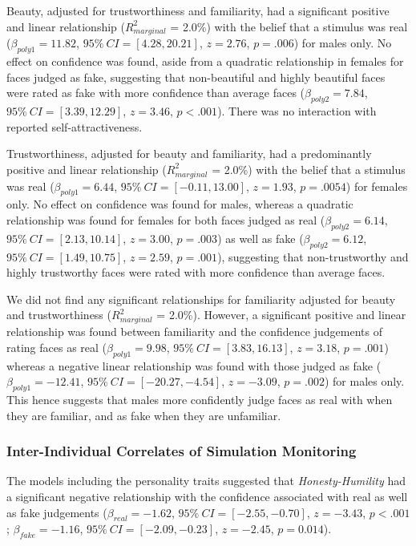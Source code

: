 \documentclass[
  man,floatsintext]{apa6}
\begin{document}
Beauty, adjusted for trustworthiness and familiarity, had a significant positive and linear relationship (\(R^2_{marginal}\) = 2.0\%) with the belief that a stimulus was real (\(\beta_{poly1} = 11.82\), \(95\%~CI = [4.28, 20.21]\), \(z = 2.76\), \(p = .006\)) for males only. No effect on confidence was found, aside from a quadratic relationship in females for faces judged as fake, suggesting that non-beautiful and highly beautiful faces were rated as fake with more confidence than average faces (\(\beta_{poly2} = 7.84\), \(95\%~CI = [3.39, 12.29]\), \(z = 3.46\), \(p < .001\)). There was no interaction with reported self-attractiveness.

Trustworthiness, adjusted for beauty and familiarity, had a predominantly positive and linear relationship (\(R^2_{marginal}\) = 2.0\%) with the belief that a stimulus was real (\(\beta_{poly1} = 6.44\), \(95\%~CI = [-0.11, 13.00]\), \(z = 1.93\), \(p = .0054\)) for females only. No effect on confidence was found for males, whereas a quadratic relationship was found for females for both faces judged as real (\(\beta_{poly2} = 6.14\), \(95\%~CI = [2.13, 10.14]\), \(z = 3.00\), \(p = .003\)) as well as fake (\(\beta_{poly2} =6.12\), \(95\%~CI = [1.49, 10.75]\), \(z = 2.59\), \(p = .001\)), suggesting that non-trustworthy and highly trustworthy faces were rated with more confidence than average faces.

We did not find any significant relationships for familiarity adjusted for beauty and trustworthiness (\(R^2_{marginal}\) = 2.0\%). However, a significant positive and linear relationship was found between familiarity and the confidence judgements of rating faces as real (\(\beta_{poly1} = 9.98\), \(95\%~CI = [3.83, 16.13]\), \(z = 3.18\), \(p = .001\)) whereas a negative linear relationship was found with those judged as fake (\(\beta_{poly1} = -12.41\), \(95\%~CI = [-20.27, -4.54]\), \(z = -3.09\), \(p = .002\)) for males only. This hence suggests that males more confidently judge faces as real with when they are familiar, and as fake when they are unfamiliar.

\hypertarget{inter-individual-correlates-of-simulation-monitoring}{%
\subsubsection{Inter-Individual Correlates of Simulation Monitoring}\label{inter-individual-correlates-of-simulation-monitoring}}

The models including the personality traits suggested that \emph{Honesty-Humility} had a significant negative relationship with the confidence associated with real as well as fake judgements (\(\beta_{real} = -1.62\), \(95\%~CI = [-2.55, -0.70]\), \(z = -3.43\), \(p < .001\); \(\beta_{fake} = -1.16\), \(95\%~CI = [-2.09, -0.23]\), \(z = -2.45\), \(p = 0.014\)).
\end{document}
